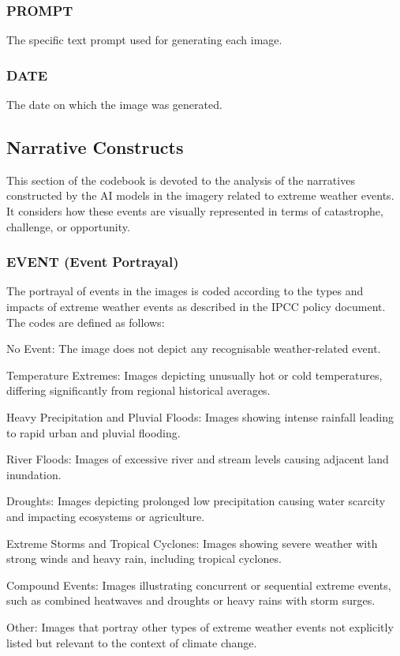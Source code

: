  \subsubsection*{PROMPT} 

 The specific text prompt used for generating each image.

 \subsubsection*{DATE} 

The date on which the image was generated.
\subsection{Narrative Constructs}

This section of the codebook is devoted to the analysis of the narratives constructed by the AI models in the imagery related to extreme weather events. It considers how these events are visually represented in terms of catastrophe, challenge, or opportunity.

\subsubsection*{EVENT (Event Portrayal)}
The portrayal of events in the images is coded according to the types and impacts of extreme weather events as described in the IPCC policy document. The codes are defined as follows:

\begin{description}[leftmargin=2.5cm, style = multiline, labelwidth=1.5cm]
\item[0] No Event: The image does not depict any recognisable weather-related event.
\item[1] Temperature Extremes: Images depicting unusually hot or cold temperatures, differing significantly from regional historical averages.
\item[2] Heavy Precipitation and Pluvial Floods: Images showing intense rainfall leading to rapid urban and pluvial flooding.
\item[3] River Floods: Images of excessive river and stream levels causing adjacent land inundation.
\item[4] Droughts: Images depicting prolonged low precipitation causing water scarcity and impacting ecosystems or agriculture.
\item[5] Extreme Storms and Tropical Cyclones: Images showing severe weather with strong winds and heavy rain, including tropical cyclones.
\item[6] Compound Events: Images illustrating concurrent or sequential extreme events, such as combined heatwaves and droughts or heavy rains with storm surges.
\item[7] Other: Images that portray other types of extreme weather events not explicitly listed but relevant to the context of climate change.
\end{description}


